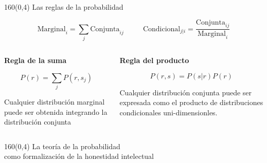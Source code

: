 \documentclass[shownotes,aspectratio=169]{beamer}
\begin{document}
\begin{frame}[plain]
\begin{textblock}{160}(0,4)
\centering \LARGE  Las reglas de la probabilidad
\end{textblock}


\vspace{0.75cm}



\begin{equation*}
  \text{Marginal}_{i} = \sum_j \text{Conjunta}_{ij}  \ \ \ \ \ \ \ \ \ \ \ \  \text{Condicional}_{j|i} = \frac{\text{Conjunta}_{ij}}{\text{Marginal}_{i}}
\end{equation*}

\pause
\vspace{0.75cm}


\begin{columns}[t]
\begin{column}{0.5\textwidth}
 \centering \textbf{Regla de la suma}
 
 
\begin{equation*}
 P(r) = \sum_j P(r,s_j)
\end{equation*}
 
 \justifying \footnotesize
  Cualquier distribución marginal puede ser obtenida integrando la distribución conjunta

 \end{column}
 \begin{column}{0.5\textwidth}
\centering  \textbf{Regla del producto}

\begin{equation*}
 P(r,s) = P(s|r) P(r)
\end{equation*}

 \justifying \footnotesize
Cualquier distribución conjunta puede ser expresada como el producto de distribuciones condicionales uni-dimensionles.

\end{column}
\end{columns}

\end{frame}
 
\begin{frame}[plain]
\begin{textblock}{160}(0,4)
\centering \LARGE La teoría de la probabilidad \\ \Large como formalización de la honestidad intelectual
\end{textblock}
\vspace{0.75cm}


\end{frame}
 
\end{document}
